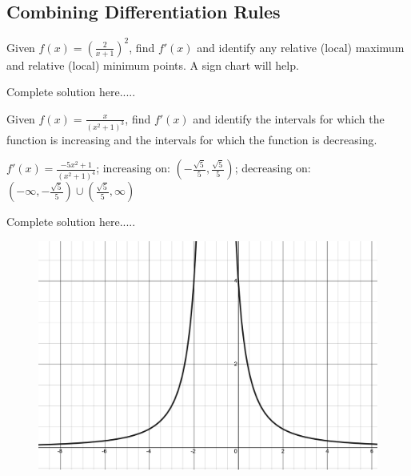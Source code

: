 \subsection*{Combining Differentiation Rules}
\begin{example}
Given $f(x)=\left(\displaystyle\frac{2}{x+1}\right)^2$, find $f'(x)$ and identify any relative (local) maximum and relative (local) minimum points. A sign chart will help.
    \begin{sol}
    \end{sol}
    \begin{solL}
    Complete solution here.....
    
    \end{solL}
    
\end{example}
\begin{example}
Given $f(x)=\displaystyle\frac{x}{(x^2+1)^3}$, find $f'(x)$ and identify the intervals for which the function is increasing and the intervals for which the function is decreasing.
    \begin{sol}
   $f'(x)=\displaystyle\frac{-5x^2+1}{(x^2+1)^4}$; increasing on: $\left(-\frac{\sqrt{5}}{5},\frac{\sqrt{5}}{5}\right)$; decreasing on: $\left(-\infty,-\frac{\sqrt{5}}{5}\right)\cup \left(\frac{\sqrt{5}}{5},\infty\right)$
    \end{sol}
    \begin{solL}
    Complete solution here.....
    
    \end{solL}
    
\end{example}
\newpage
 \begin{figure}[h!]
 \centering
    \includegraphics[scale=0.175]{images/productQuotient/11_3.png}
    \caption{}
    \end{figure}
    
